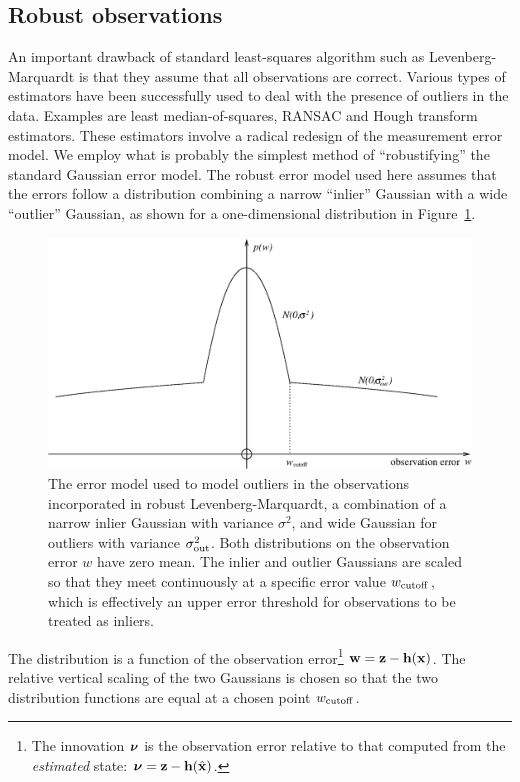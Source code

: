 \documentclass{article}
\begin{document}
\subsection{Robust observations}
An important drawback of standard least-squares algorithm such as
Levenberg-Marquardt is that they assume that all observations are correct.
Various types of estimators have been successfully used to deal with
the presence of outliers in the data.
Examples are least median-of-squares, RANSAC and Hough transform estimators.
These estimators involve a radical redesign of the measurement error model.
We employ what is probably
the simplest method of ``robustifying'' the standard Gaussian error model.
The robust error model used here assumes that the errors follow a
distribution combining a narrow ``inlier'' Gaussian with a wide ``outlier''
Gaussian, as shown for a one-dimensional distribution in
Figure~\ref{gauss_mix}.
\begin{figure}
 \centerline{\includegraphics[width=150mm]{gauss_mix}}
  \caption{The error model used to model outliers in the observations
	incorporated in robust Levenberg-Marquardt,
	a combination of a narrow inlier Gaussian with
	variance $\sigma^2$, and wide Gaussian for outliers with
	variance $\sigma_{\rm out}^2$. Both distributions on the
	observation error $w$ have zero mean. The inlier and outlier
	Gaussians are scaled so that they meet continuously at a specific
	error value $w_{\rm cutoff}$, which is effectively an upper error
	threshold for observations to be treated as inliers.}
 \label{gauss_mix}
\end{figure}
The distribution is a function of the observation error\footnote{The innovation
$\mbox{\boldmath $\nu$}$ is the observation error relative to that computed from the
{\em estimated} state: $\mbox{\boldmath $\nu$} = {\bf z} - {\bf h}(\hat{\bf x})$.}
${\bf w} = {\bf z} - {\bf h}({\bf x})$.
The relative vertical scaling of the two Gaussians is chosen so that the
two distribution functions are equal at a chosen point $w_{\rm cutoff}$.
\end{document}
